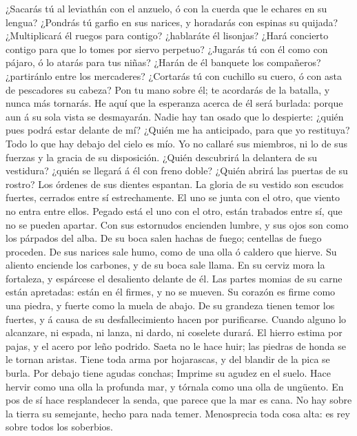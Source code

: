  ¿Sacarás tú al leviathán con el anzuelo, ó con la cuerda
que le echares en su lengua?  ¿Pondrás tú garfio en sus
narices, y horadarás con espinas su quijada?  ¿Multiplicará
él ruegos para contigo? ¿hablaráte él lisonjas?  ¿Hará
concierto contigo para que lo tomes por siervo perpetuo? 
¿Jugarás tú con él como con pájaro, ó lo atarás para tus niñas?
 ¿Harán de él banquete los compañeros? ¿partiránlo entre los
mercaderes?  ¿Cortarás tú con cuchillo su cuero, ó con asta
de pescadores su cabeza?  Pon tu mano sobre él; te acordarás
de la batalla, y nunca más tornarás.  He aquí que la
esperanza acerca de él será burlada: porque aun á su sola vista se
desmayarán.  Nadie hay tan osado que lo despierte: ¿quién
pues podrá estar delante de mí?  ¿Quién me ha anticipado,
para que yo restituya? Todo lo que hay debajo del cielo es mío.
 Yo no callaré sus miembros, ni lo de sus fuerzas y la
gracia de su disposición.  ¿Quién descubrirá la delantera
de su vestidura? ¿quién se llegará á él con freno doble? 
¿Quién abrirá las puertas de su rostro? Los órdenes de sus dientes
espantan.  La gloria de su vestido son escudos fuertes,
cerrados entre sí estrechamente.  El uno se junta con el
otro, que viento no entra entre ellos.  Pegado está el uno
con el otro, están trabados entre sí, que no se pueden apartar.
 Con sus estornudos encienden lumbre, y sus ojos son como
los párpados del alba.  De su boca salen hachas de fuego;
centellas de fuego proceden.  De sus narices sale humo,
como de una olla ó caldero que hierve.  Su aliento enciende
los carbones, y de su boca sale llama.  En su cerviz mora
la fortaleza, y espárcese el desaliento delante de él.  Las
partes momias de su carne están apretadas: están en él firmes, y no se
mueven.  Su corazón es firme como una piedra, y fuerte como
la muela de abajo.  De su grandeza tienen temor los
fuertes, y á causa de su desfallecimiento hacen por purificarse.
 Cuando alguno lo alcanzare, ni espada, ni lanza, ni dardo,
ni coselete durará.  El hierro estima por pajas, y el acero
por leño podrido.  Saeta no le hace huir; las piedras de
honda se le tornan aristas.  Tiene toda arma por
hojarascas, y del blandir de la pica se burla.  Por debajo
tiene agudas conchas; Imprime su agudez en el suelo.  Hace
hervir como una olla la profunda mar, y tórnala como una olla de
ungüento.  En pos de sí hace resplandecer la senda, que
parece que la mar es cana.  No hay sobre la tierra su
semejante, hecho para nada temer.  Menosprecia toda cosa
alta: es rey sobre todos los soberbios.

